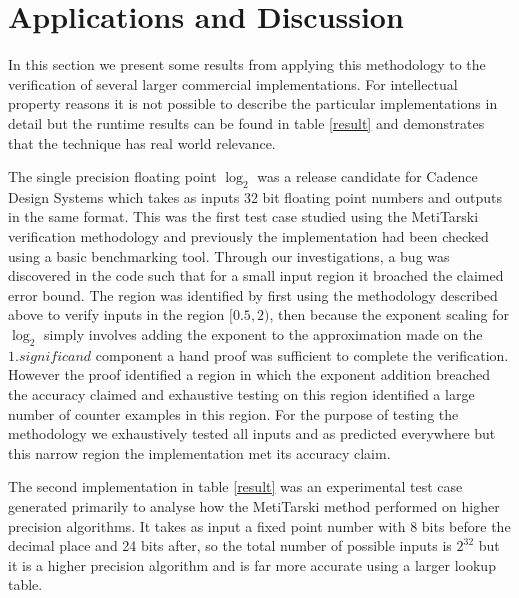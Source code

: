 \documentclass[a4]{article}
\begin{document}
\section{Applications and Discussion}
In this section we present some results from applying this methodology to the verification of several larger commercial implementations. For intellectual property reasons it is not possible to describe the particular implementations in detail but the runtime results can be found in table \ref{result} and demonstrates that the technique has real world relevance. 

The single precision floating point $\log_2$ was a release candidate for Cadence Design Systems which takes as inputs 32 bit floating point numbers and outputs in the same format. This was the first test case studied using the MetiTarski verification methodology and previously the implementation had been checked using a basic benchmarking tool. Through our investigations, a bug was discovered in the code such that for a small input region it broached the claimed error bound. The region was identified by first using the methodology described above to verify inputs in the region $[0.5,2)$, then because the exponent scaling for $\log_2$ simply involves adding the exponent to the approximation made on the $1.significand$ component a hand proof was sufficient to complete the verification. However the proof identified a region in which the exponent addition breached the accuracy claimed and exhaustive testing on this region identified a large number of counter examples in this region. For the purpose of testing the methodology we exhaustively tested all inputs and as predicted everywhere but this narrow region the implementation met its accuracy claim.

The second implementation in table \ref{result} was an experimental test case generated primarily to analyse how the MetiTarski method performed on higher precision algorithms. It takes as input a fixed point number with 8 bits before the decimal place and 24 bits after, so the total number of possible inputs is $2^{32}$ but it is a higher precision algorithm and is far more accurate using a larger lookup table.
\end{document}
